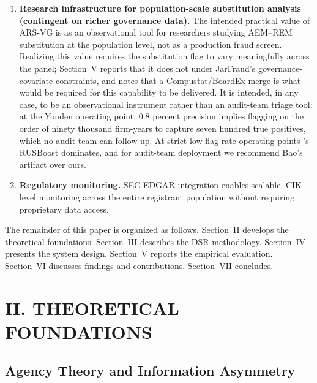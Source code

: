 \documentclass[12pt]{article}
\begin{document}
\begin{enumerate}
    \item[\textbf{PC1}] \textbf{Research infrastructure for
    population-scale substitution analysis (contingent on richer
    governance data).}  The intended practical value of
    ARS-VG is as an observational tool for researchers studying
    AEM--REM substitution at the population level, not as a
    production fraud screen.  Realizing this value requires the
    substitution flag to vary meaningfully across the panel; Section~V
    reports that it does not under JarFraud's governance-covariate
    constraints, and notes that a Compustat/BoardEx merge is what
    would be required for this capability to be delivered.  It is
    intended, in any case,
    to be an observational instrument rather than an audit-team triage
    tool: at the Youden operating point, 0.8 percent precision implies
    flagging on the order of ninety thousand firm-years to capture
    seven hundred true positives, which no audit team can follow up.
    At strict low-flag-rate operating points \citet{bao2020}'s
    RUSBoost dominates, and for audit-team deployment we recommend
    Bao's artifact over ours.

    \item[\textbf{PC2}] \textbf{Regulatory monitoring.}  SEC EDGAR integration
    enables scalable, CIK-level monitoring across the entire registrant
    population without requiring proprietary data access.
\end{enumerate}

The remainder of this paper is organized as follows.
Section~II develops the theoretical foundations.
Section~III describes the DSR methodology.
Section~IV presents the system design.
Section~V reports the empirical evaluation.
Section~VI discusses findings and contributions.
Section~VII concludes.

\section*{\centering II. THEORETICAL FOUNDATIONS}
\label{sec:theory}

\subsection*{Agency Theory and Information Asymmetry}
\end{document}
